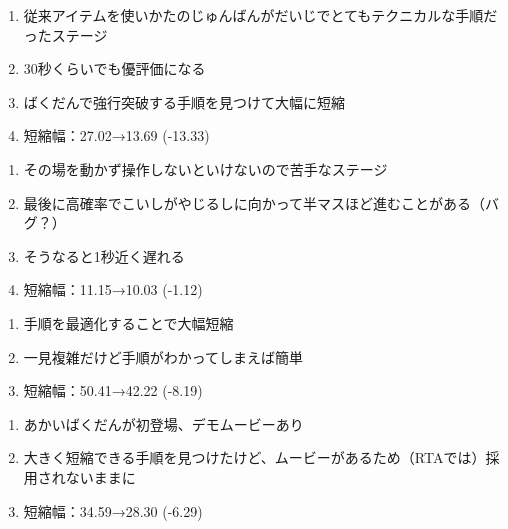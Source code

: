 \begin{enumerate}[label={\sarrow}]
\item 従来アイテムを使いかたのじゅんばんがだいじでとてもテクニカルな手順だったステージ
\item 30秒くらいでも優評価になる
\item ばくだんで強行突破する手順を見つけて大幅に短縮
\item 短縮幅：27.02→13.69 (-13.33)
\end{enumerate}



\clearpage
\begin{enumerate}[label={\sarrow}]
\item その場を動かず操作しないといけないので苦手なステージ
\item 最後に高確率でこいしがやじるしに向かって半マスほど進むことがある（バグ？）
\item そうなると1秒近く遅れる
\item 短縮幅：11.15→10.03 (-1.12)
\end{enumerate}



\begin{enumerate}[label={\sarrow}]
\item 手順を最適化することで大幅短縮
\item 一見複雑だけど手順がわかってしまえば簡単
\item 短縮幅：50.41→42.22 (-8.19)
\end{enumerate}



\begin{enumerate}[label={\sarrow}]
\item あかいばくだんが初登場、デモムービーあり
\item 大きく短縮できる手順を見つけたけど、ムービーがあるため（RTAでは）採用されないままに
\item 短縮幅：34.59→28.30 (-6.29)
\end{enumerate}



